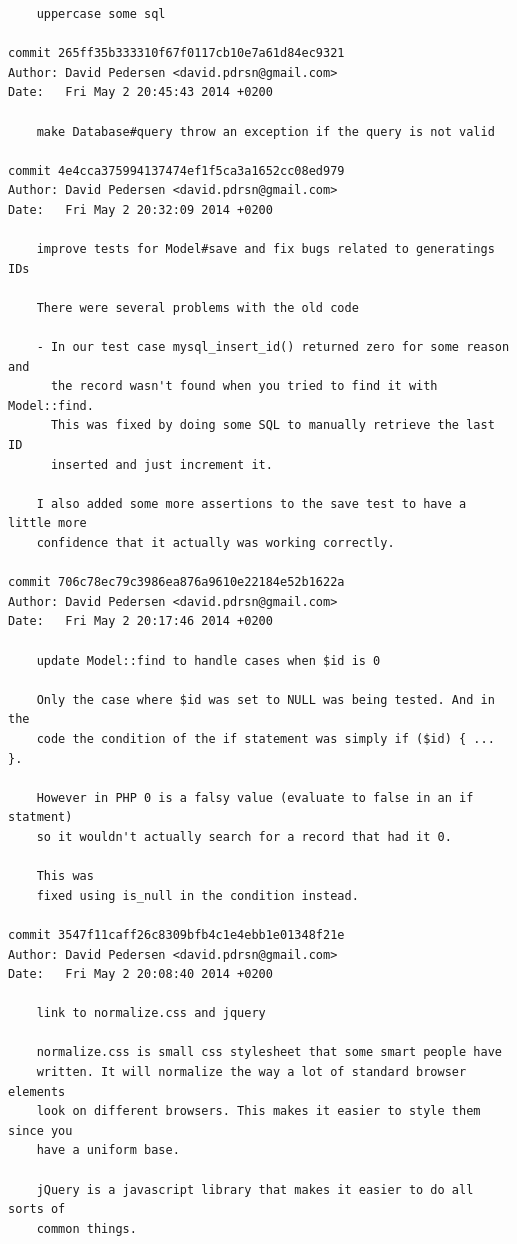 \documentclass[12pt]{article}
\begin{document}
\begin{verbatim}
    uppercase some sql

commit 265ff35b333310f67f0117cb10e7a61d84ec9321
Author: David Pedersen <david.pdrsn@gmail.com>
Date:   Fri May 2 20:45:43 2014 +0200

    make Database#query throw an exception if the query is not valid

commit 4e4cca375994137474ef1f5ca3a1652cc08ed979
Author: David Pedersen <david.pdrsn@gmail.com>
Date:   Fri May 2 20:32:09 2014 +0200

    improve tests for Model#save and fix bugs related to generatings IDs
    
    There were several problems with the old code
    
    - In our test case mysql_insert_id() returned zero for some reason and
      the record wasn't found when you tried to find it with Model::find.
      This was fixed by doing some SQL to manually retrieve the last ID
      inserted and just increment it.
    
    I also added some more assertions to the save test to have a little more
    confidence that it actually was working correctly.

commit 706c78ec79c3986ea876a9610e22184e52b1622a
Author: David Pedersen <david.pdrsn@gmail.com>
Date:   Fri May 2 20:17:46 2014 +0200

    update Model::find to handle cases when $id is 0
    
    Only the case where $id was set to NULL was being tested. And in the
    code the condition of the if statement was simply if ($id) { ... }.
    
    However in PHP 0 is a falsy value (evaluate to false in an if statment)
    so it wouldn't actually search for a record that had it 0.
    
    This was
    fixed using is_null in the condition instead.

commit 3547f11caff26c8309bfb4c1e4ebb1e01348f21e
Author: David Pedersen <david.pdrsn@gmail.com>
Date:   Fri May 2 20:08:40 2014 +0200

    link to normalize.css and jquery
    
    normalize.css is small css stylesheet that some smart people have
    written. It will normalize the way a lot of standard browser elements
    look on different browsers. This makes it easier to style them since you
    have a uniform base.
    
    jQuery is a javascript library that makes it easier to do all sorts of
    common things.
    

\end{verbatim}
\end{document}
